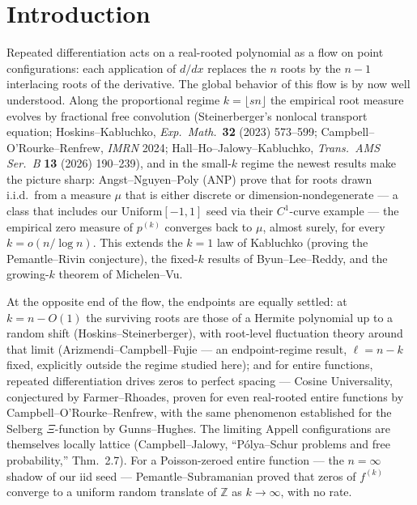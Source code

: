 \documentclass[11pt]{article}
\begin{document}
\section{Introduction}

Repeated differentiation acts on a real-rooted polynomial as a flow on point configurations:
each application of $d/dx$ replaces the $n$ roots by the $n-1$ interlacing roots of the
derivative. The global behavior of this flow is by now well understood. Along the proportional
regime $k=\lfloor sn\rfloor$ the empirical root measure evolves by fractional free convolution
(Steinerberger's nonlocal transport equation; Hoskins--Kabluchko, \emph{Exp.\ Math.}\ \textbf{32}
(2023) 573--599; Campbell--O'Rourke--Renfrew, \emph{IMRN} 2024;
Hall--Ho--Jalowy--Kabluchko, \emph{Trans.\ AMS Ser.\ B} \textbf{13} (2026) 190--239), and in
the small-$k$ regime the newest results make the picture sharp: Angst--Nguyen--Poly (ANP)
prove that for roots drawn i.i.d.\ from a measure $\mu$ that is either discrete or
dimension-nondegenerate --- a class that includes our $\mathrm{Uniform}[-1,1]$ seed via their
$C^{1}$-curve example --- the empirical zero measure of $p^{(k)}$ converges back to $\mu$,
almost surely, for every $k=o(n/\log n)$. This extends the $k=1$ law of Kabluchko (proving the
Pemantle--Rivin conjecture), the fixed-$k$ results of Byun--Lee--Reddy, and the growing-$k$
theorem of Michelen--Vu.

At the opposite end of the flow, the endpoints are equally settled: at $k=n-O(1)$ the
surviving roots are those of a Hermite polynomial up to a random shift
(Hoskins--Steinerberger), with root-level fluctuation theory around that limit
(Arizmendi--Campbell--Fujie --- an endpoint-regime result, $\ell=n-k$ fixed, explicitly
outside the regime studied here); and for entire functions, repeated differentiation drives
zeros to perfect spacing --- Cosine Universality, conjectured by Farmer--Rhoades, proven for
even real-rooted entire functions by Campbell--O'Rourke--Renfrew, with the same phenomenon
established for the Selberg $\Xi$-function by Gunns--Hughes. The limiting Appell configurations
are themselves locally lattice (Campbell--Jalowy, ``P\'olya--Schur problems and free
probability,'' Thm.~2.7). For a Poisson-zeroed entire function --- the $n=\infty$ shadow of our
iid seed --- Pemantle--Subramanian proved that zeros of $f^{(k)}$ converge to a uniform random
translate of $\mathbb{Z}$ as $k\to\infty$, with no rate.
\end{document}
